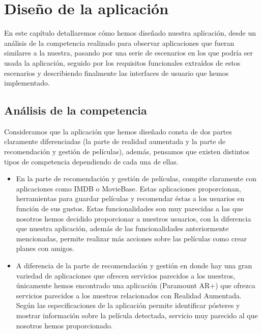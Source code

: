 
\cleardoublepage


\chapter{Diseño de la aplicación}
\label{makereference3}
En este capítulo detallaremos cómo hemos diseñado nuestra aplicación, desde un análisis de la competencia realizado para 
observar aplicaciones que fueran similares a la nuestra, pasando por una serie de escenarios en los que podría ser usada la aplicación, 
seguido por los requisitos funcionales extraídos de estos escenarios y describiendo finalmente las interfaces de usuario que hemos implementado.

\section{Análisis de la competencia}
\label{makereference3.1}
    Consideramos que la aplicación que hemos diseñado consta de dos partes claramente diferenciadas (la parte de realidad aumentada
    y la parte de recomendación y gestión de películas), además, pensamos que existen distintos tipos de competencia dependiendo de cada una de ellas.
     \begin{itemize}  
         \item En la parte de recomendación y gestión de películas, compite claramente con aplicaciones como IMDB\cite{imdb} o MovieBase\cite{moviebase}. 
         Estas aplicaciones proporcionan, herramientas para guardar películas y recomendar éstas a los usuarios en función de sus gustos. Estas funcionalidades son 
         muy parecidas a las que nosotros hemos decidido proporcionar a nuestros usuarios, con la diferencia que nuestra aplicación, además de las funcionalidades anteriormente 
         mencionadas, permite realizar más acciones sobre las películas como crear planes con amigos.
        \item A diferencia de la parte de recomendación y gestión en donde hay una gran variedad de aplicaciones que ofrecen servicios parecidos a los nuestros, únicamente hemos 
        encontrado una aplicación (Paramount AR+\cite{paramountar}) que ofrezca servicios parecidos a los nuestros relacionados con Realidad Aumentada. Según las especificaciones de la aplicación permite identificar pósteres y 
        mostrar información sobre la película detectada, servicio muy parecido al que nosotros hemos proporcionado. 
    \end{itemize}
    
